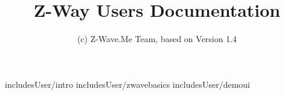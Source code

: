 \documentclass[10pt]{article}
\title{Z-Way Users Documentation}
\author{(c) Z-Wave.Me Team, based on Version 1.4}
\date{}
\begin{document}
\maketitle
\tableofcontents

 {includesUser/intro}  
 {includesUser/zwavebasics} 
 {includesUser/demoui}  
\end{document}
